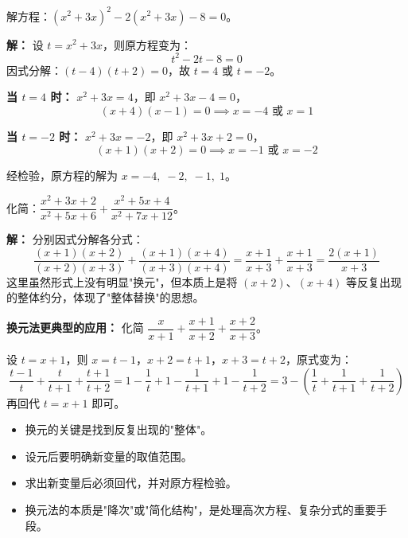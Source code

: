 \documentclass[12pt, a4paper]{ctexart}
\begin{document}
\begin{examplebox}[【例4】换元法解高次方程]
解方程：$(x^2+3x)^2 - 2(x^2+3x) - 8 = 0$。
\end{examplebox}

\textbf{解：} 设 $t = x^2 + 3x$，则原方程变为：
\[
t^2 - 2t - 8 = 0
\]
因式分解：$(t-4)(t+2) = 0$，故 $t = 4$ 或 $t = -2$。

\textbf{当 $t=4$ 时：} $x^2 + 3x = 4$，即 $x^2 + 3x - 4 = 0$，
\[
(x+4)(x-1) = 0 \implies x = -4 \text{ 或 } x = 1
\]

\textbf{当 $t=-2$ 时：} $x^2 + 3x = -2$，即 $x^2 + 3x + 2 = 0$，
\[
(x+1)(x+2) = 0 \implies x = -1 \text{ 或 } x = -2
\]

经检验，原方程的解为 $\boxed{x = -4,\; -2,\; -1,\; 1}$。

\begin{examplebox}[【例5】换元法化简分式]
化简：$\dfrac{x^2+3x+2}{x^2+5x+6} + \dfrac{x^2+5x+4}{x^2+7x+12}$。
\end{examplebox}

\textbf{解：} 分别因式分解各分式：
\[
\frac{(x+1)(x+2)}{(x+2)(x+3)} + \frac{(x+1)(x+4)}{(x+3)(x+4)}
= \frac{x+1}{x+3} + \frac{x+1}{x+3} = \frac{2(x+1)}{x+3}
\]
这里虽然形式上没有明显"换元"，但本质上是将 $(x+2)$、$(x+4)$ 等反复出现的整体约分，体现了"整体替换"的思想。

\textbf{换元法更典型的应用：} 化简 $\dfrac{x}{x+1} + \dfrac{x+1}{x+2} + \dfrac{x+2}{x+3}$。

设 $t = x+1$，则 $x = t-1$，$x+2 = t+1$，$x+3 = t+2$，原式变为：
\[
\frac{t-1}{t} + \frac{t}{t+1} + \frac{t+1}{t+2} = 1 - \frac{1}{t} + 1 - \frac{1}{t+1} + 1 - \frac{1}{t+2} = 3 - \left(\frac{1}{t} + \frac{1}{t+1} + \frac{1}{t+2}\right)
\]
再回代 $t = x+1$ 即可。

\begin{tipbox}[换元法要点总结]
\begin{itemize}[leftmargin=1.5em]
  \item 换元的关键是找到反复出现的"整体"。
  \item 设元后要明确新变量的取值范围。
  \item 求出新变量后必须回代，并对原方程检验。
  \item 换元法的本质是"降次"或"简化结构"，是处理高次方程、复杂分式的重要手段。
\end{itemize}
\end{tipbox}

\end{document}
